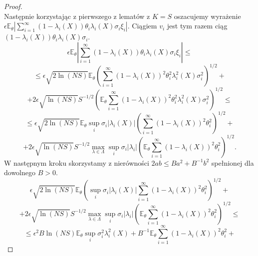 \documentclass{article}
\begin{document}
\begin{proof}
\begin{displaymath}
\end{displaymath}
Następnie korzystając z pierwszego z lematów z $K=S$ oszacujemy wyrażenie $\epsilon\mathbb{E}_{\theta}\left|\sum_{i=1}^{\infty}(1-\lambda_i(X))\theta_i\lambda_i(X)\sigma_i\xi_i\right|$. Ciągiem $v_i$ jest tym razem ciąg $(1-\lambda_i(X))\theta_i\lambda_i(X)\sigma_i$.
\begin{displaymath}
\epsilon\mathbb{E}_{\theta}\left|\sum_{i=1}^{\infty}(1-\lambda_i(X))\theta_i\lambda_i(X)\sigma_i\xi_i\right|\leq
\end{displaymath}
\begin{displaymath}
\leq \epsilon\sqrt{2\ln (NS)}\mathbb{E}_{\theta}\left(\sum_{i=1}^{\infty}(1-\lambda_i(X))^2\theta_i^2\lambda_i^2(X)\sigma_i^2\right)^{1/2}+
\end{displaymath}
\begin{displaymath}
+2\epsilon\sqrt{\ln (NS)}S^{-1/2}\left(\mathbb{E}_{\theta}\sum_{i=1}^{\infty}(1-\lambda_i(X))^2\theta_i^2\lambda_i^2(X)\sigma_i^2\right)^{1/2}\leq
\end{displaymath}
\begin{displaymath}
\leq \epsilon\sqrt{2\ln (NS)}\mathbb{E}_{\theta}\sup_i\sigma_i|\lambda_i(X)|\left(\sum_{i=1}^{\infty}(1-\lambda_i(X))^2\theta_i^2\right)^{1/2}+
\end{displaymath}
\begin{displaymath}
+2\epsilon\sqrt{\ln (NS)}S^{-1/2}\max_{\lambda\in \Lambda}\sup_i\sigma_i|\lambda_i|\left(\mathbb{E}_{\theta}\sum_{i=1}^{\infty}(1-\lambda_i(X))^2\theta_i^2\right)^{1/2}.
\end{displaymath}
W następnym kroku skorzystamy z nierówności $2ab\leq Ba^2+B^{-1}b^2$ spełnionej dla dowolnego $B>0$.
\begin{displaymath}
\epsilon\sqrt{2\ln (NS)}\mathbb{E}_{\theta}\left(\sup_i\sigma_i|\lambda_i(X)|\sum_{i=1}^{\infty}(1-\lambda_i(X))^2\theta_i^2\right)^{1/2}+
\end{displaymath}
\begin{displaymath}
+2\epsilon\sqrt{\ln (NS)}S^{-1/2}\max_{\lambda\in \Lambda}\sup_i\sigma_i|\lambda_i|\left(\mathbb{E}_{\theta}\sum_{i=1}^{\infty}(1-\lambda_i(X))^2\theta_i^2\right)^{1/2}\leq
\end{displaymath}
\begin{displaymath}
\leq \epsilon^2B\ln (NS)\mathbb{E}_{\theta}\sup_i\sigma_i^2\lambda_i^2(X)+B^{-1}\mathbb{E}_{\theta}\sum_{i=1}^{\infty}(1-\lambda_i(X))^2\theta_i^2+
\end{displaymath}
\begin{displaymath}

\end{displaymath}
\end{proof}
\end{document}
